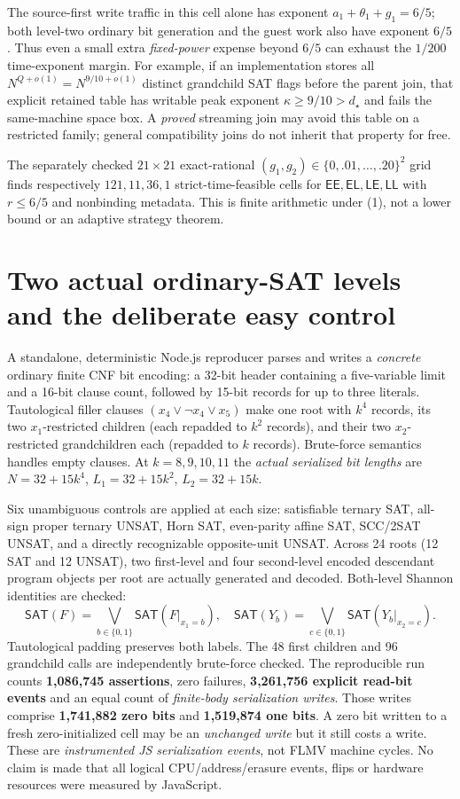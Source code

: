 \documentclass[11pt]{article}
\newcommand{\SAT}{\mathsf{SAT}}
\newcommand{\EE}{\mathsf{EE}}
\newcommand{\EL}{\mathsf{EL}}
\newcommand{\LE}{\mathsf{LE}}
\newcommand{\LL}{\mathsf{LL}}
\begin{document}
The source-first write traffic in this cell alone has
exponent $a_1+\theta_1+g_1=6/5$; both level-two
ordinary bit generation and the guest work also have exponent $6/5$.
Thus even a small extra \emph{fixed-power} expense beyond
$6/5$ can exhaust the $1/200$ time-exponent margin.
For example, if an implementation stores all
$N^{Q+o(1)}=N^{9/10+o(1)}$
distinct grandchild SAT flags before the parent join,
that explicit retained table has writable peak exponent
$\kappa\ge9/10>d_\star$ and fails the same-machine
space box. A \emph{proved} streaming join may avoid
this table on a restricted family; general compatibility
joins do not inherit that property for free.

The separately checked $21\times21$ exact-rational
$(g_1,g_2)\in\{0,.01,\ldots,.20\}^2$ grid finds respectively
$121,11,36,1$ strict-time-feasible cells for
$\EE,\EL,\LE,\LL$ with $r\le6/5$ and nonbinding
metadata. This is finite arithmetic under (1),
not a lower bound or an adaptive strategy theorem.

\section*{Two actual ordinary-SAT levels and the deliberate easy control}
A standalone, deterministic Node.js reproducer parses and writes
a \emph{concrete} ordinary finite CNF bit encoding:
a 32-bit header containing a five-variable limit and a 16-bit
clause count, followed by 15-bit records for up to three literals.
Tautological filler clauses $(x_4\lor\neg x_4\lor x_5)$
make one root with $k^4$ records, its two $x_1$-restricted
children (each repadded to $k^2$ records), and their two
$x_2$-restricted grandchildren each (repadded to $k$
records). Brute-force semantics handles empty clauses.
At $k=8,9,10,11$ the \emph{actual serialized bit lengths}
are $N=32+15k^4$, $L_1=32+15k^2$,
$L_2=32+15k$.

Six unambiguous controls are applied at each size:
satisfiable ternary SAT, all-sign proper ternary UNSAT,
Horn SAT, even-parity affine SAT, SCC/2SAT UNSAT,
and a directly recognizable opposite-unit UNSAT.
Across 24 roots (12 SAT and 12 UNSAT), two
first-level and four second-level encoded descendant
program objects per root are actually generated and
decoded. Both-level Shannon identities are checked:
\[
\SAT(F)=\bigvee_{b\in\{0,1\}}\SAT(F|_{x_1=b}),
\quad
\SAT(Y_b)=\bigvee_{c\in\{0,1\}}
\SAT(Y_b|_{x_2=c}).
\]
Tautological padding preserves both labels.
The 48 first children and 96 grandchild calls
are independently brute-force checked.
The reproducible run counts \textbf{1,086,745
assertions}, zero failures, \textbf{3,261,756
explicit read-bit events} and an equal count of
\emph{finite-body serialization writes}.
Those writes comprise \textbf{1,741,882 zero bits}
and \textbf{1,519,874 one bits}. A zero bit written
to a fresh zero-initialized cell may be
an \emph{unchanged write} but it still costs a write.
These are \emph{instrumented JS serialization events},
not FLMV machine cycles. No claim is made that
all logical CPU/address/erasure events, flips or hardware
resources were measured by JavaScript.
\end{document}
